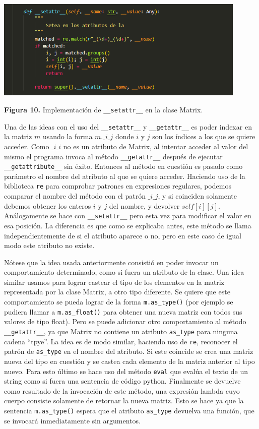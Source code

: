 \documentclass[10pt]{article} %
\newcommand{\csl}[1]{\colorbox{backcolour}{\texttt{#1}}}
\newcommand{\imgcaption}[2]{\tiny \textbf{Figura #1.} #2.}
\newcommand{\mgc}[2][]{\colorbox{backcolour}{\texttt{\_\_#2\_\_#1}}}
\newcommand{\mgccapt}[1]{\texttt{\_\_#1\_\_}}
\begin{document}
\begin{center}
	\includegraphics[width=12cm]{setattr.png}
	
	\imgcaption{10}{Implementaci\'on de \mgccapt{setattr} en la clase Matrix}
\end{center}

Una de las ideas con el uso del \mgc{setattr} y \mgc{getattr} es poder indexar en la matriz $m$ usando la forma \csl{$m.\_i\_j$} donde $i$ y $j$ son los \'indices a los que se quiere acceder. Como \csl{$\_i\_i$} no es un atributo de Matrix, al intentar acceder al valor del mismo el programa invoca al m\'etodo \mgc{getattr} despu\'es de ejecutar \mgc{getattribute} sin \'exito. Entonces al m\'etodo en cuesti\'on es pasado como par\'ametro el nombre del atributo al que se quiere acceder. Haciendo uso de la biblioteca \csl{re} para comprobar patrones en expresiones regulares, podemos comparar el nombre del m\'etodo con el patr\'on \csl{$\_i\_j$}, y si coinciden solamente debemos obtener los enteros $i$ y $j$ del nombre, y devolver \csl{$self[i][j]$}. An\'alogamente se hace con \mgc{setattr} pero esta vez para modificar el valor en esa posici\'on. La diferencia es que como se explicaba antes, este m\'etodo se llama independientemente de si el atributo aparece o no, pero en este caso de igual modo este atributo no existe.

N\'otese que la idea usada anteriormente consisti\'o en poder invocar un comportamiento determinado, como si fuera un atributo de la clase. Una idea similar usamos para lograr castear el tipo de los elementos en la matriz representada por la clase Matrix, a otro tipo diferente. Se quiere que este comportamiento se pueda lograr de la forma \csl{m.as\_type()} (por ejemplo se pudiera llamar a \csl{m.as\_float()} para obtener una nueva matriz con todos sus valores de tipo float). Pero se puede adicionar otro comportamiento al m\'etodo \mgc{getattr}, ya que Matrix no contiene un atributo \csl{as\_type} para ninguna cadena ``tpye''. La idea es de modo similar, haciendo uso de \csl{re}, reconocer el patr\'on de \csl{as\_type} en el nombre del atributo. Si este coincide se crea una matriz nueva del tipo en cuesti\'on y se castea cada elemento de la matriz anterior al tipo nuevo. Para esto \'ultimo se hace uso del m\'etodo \csl{eval} que eval\'ua el texto de un string como si fuera una sentencia de c\'odigo python. Finalmente se devuelve como resultado de la invocaci\'on de este m\'etodo, una expresi\'on lambda cuyo cuerpo consiste solamente de retornar la nueva matriz. Esto se hace ya que la sentencia \csl{m.as\_type()} espera que el atributo \csl{as\_type} devuelva una funci\'on, que se invocar\'a inmediatamente sin argumentos.
\end{document}
